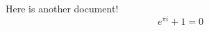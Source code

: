 \documentclass{article}
\begin{document}
Here is another document!
\[e^{\pi i} + 1 = 0\]
\end{document}
